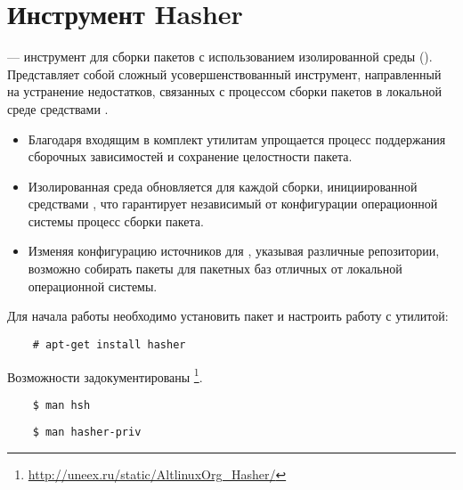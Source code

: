\hypertarget{5}{\chapter{Инструмент Hasher}}
 --- инструмент для сборки пакетов с использованием изолированной среды ().
Представляет собой сложный усовершенствованный инструмент, направленный на устранение недостатков,
связанных с процессом сборки пакетов в локальной среде средствами .
\begin{itemize}
	\item Благодаря входящим в комплект утилитам упрощается процесс поддержания сборочных зависимостей и сохранение
	целостности пакета.
	\item  Изолированная среда обновляется для каждой сборки, инициированной средствами ,
	что гарантирует независимый от конфигурации операционной системы процесс сборки пакета.
	\item  Изменяя конфигурацию источников для , указывая различные
	репозитории, возможно собирать пакеты для пакетных баз отличных от локальной
	операционной системы.
\end{itemize}

Для начала работы необходимо установить пакет  и настроить работу с утилитой:
\begin{verbatim}
	# apt-get install hasher
\end{verbatim}

Возможности  задокументированы%
\footnote{\href{http://uneex.ru/static/AltlinuxOrg_Hasher/}{http://uneex.ru/static/AltlinuxOrg\_Hasher/}}.
\begin{verbatim}
	$ man hsh
\end{verbatim}

\begin{verbatim}
	$ man hasher-priv
\end{verbatim}

